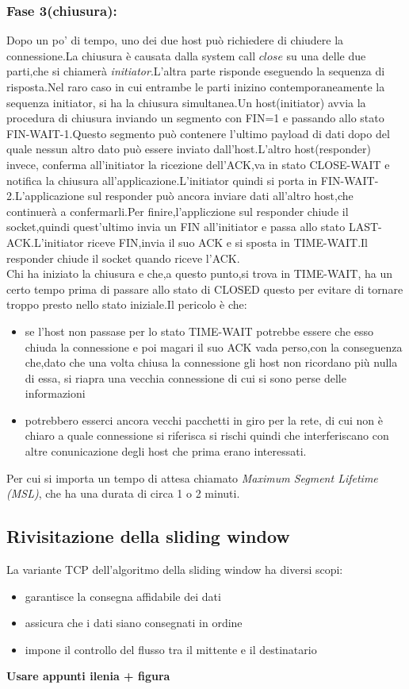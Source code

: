 \subsubsection{Fase 3(chiusura):}
Dopo un po' di tempo, uno dei due host può richiedere di chiudere la connessione.La chiusura è causata dalla system call $close$ su una delle due parti,che si chiamerà \textit{initiator}.L'altra parte risponde eseguendo la sequenza di risposta.Nel raro caso in cui entrambe le parti inizino contemporaneamente la sequenza initiator, si ha la chiusura simultanea.Un host(initiator) avvia la procedura di chiusura inviando un segmento con FIN=1 e passando allo stato FIN-WAIT-1.Questo segmento può contenere l'ultimo payload di dati dopo del quale nessun altro dato può essere inviato dall'host.L'altro host(responder) invece, conferma all'initiator la ricezione dell'ACK,va in stato CLOSE-WAIT e notifica la chiusura all'applicazione.L'initiator quindi si porta in FIN-WAIT-2.L'applicazione sul responder può ancora inviare dati all'altro host,che continuerà a confermarli.Per finire,l'appliczione sul responder chiude il socket,quindi quest'ultimo invia un FIN all'initiator e passa allo stato LAST-ACK.L'initiator riceve FIN,invia il suo ACK e si sposta in TIME-WAIT.Il responder chiude il socket quando riceve l'ACK. \\
Chi ha iniziato la chiusura e che,a questo punto,si trova in TIME-WAIT, ha un certo tempo prima di passare allo stato di CLOSED questo per evitare di tornare troppo presto nello stato iniziale.Il pericolo è che:
\begin{itemize}
  \item se l'host non passase per lo stato TIME-WAIT potrebbe essere che esso chiuda la connessione e poi magari il suo ACK vada perso,con la conseguenza che,dato che una volta chiusa la connessione gli host non ricordano più nulla di essa, si riapra una vecchia connessione di cui si sono perse delle informazioni
  \item potrebbero esserci ancora vecchi pacchetti in giro per la rete, di cui non è chiaro a quale connessione si riferisca si rischi quindi che interferiscano con altre conunicazione degli host che prima erano interessati.
\end{itemize}
Per cui si importa un tempo di attesa chiamato \textit{Maximum Segment Lifetime (MSL)}, che ha una durata di circa 1 o 2 minuti.
\subsection{Rivisitazione della sliding window}
La variante TCP dell'algoritmo della sliding window ha diversi scopi:
\begin{itemize}
  \item garantisce la consegna affidabile dei dati
  \item assicura che i dati siano consegnati in ordine
  \item impone il controllo del flusso tra il mittente e il destinatario
\end{itemize}
\textbf{Usare appunti ilenia + figura}
